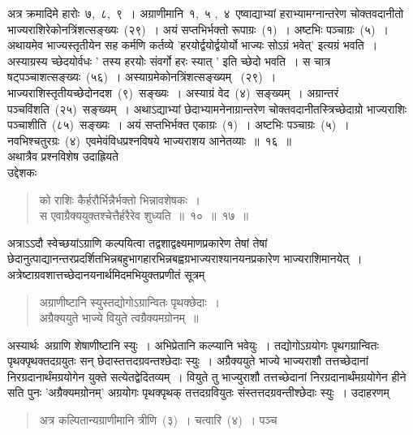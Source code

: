 \documentclass[11pt, openany]{book}
\begin{document}
\indent
अत्र क्रमादिमे हारोः~७,~८,~९~। अग्राणीमानि~१,~५ ,~४~एष्वाद्याभ्यां हराभ्यामग्नान्तरेण चोक्तवदानीतो भाज्यराशिरेकोनत्रिंशत्सङ्ख्यः~(२९)~। अयं सप्तभिर्भक्तो रूपाग्रः~(१)~। अष्टभिः पञ्चाग्रः~(५)~। अथायमेव भाज्यस्तृतीयेन सह कर्मणि कर्तव्ये 'हरयोर्द्वयोर्द्वयोर्यो भाज्यः सोऽग्रं भवेत्' इत्यग्रं भवति~। अस्याग्रस्य च्छेदयोर्वधः ' तस्य हरयोः संवर्गो हरः स्यात् ' इति च्छेदो भवति~। स चात्र षट्पञ्चाशत्सङ्ख्यः~(५६)~। अस्याग्रमेकोनत्रिंशत्सङ्ख्यम् ~(२९)~। भाज्यराशिस्तृतीयच्छेदोनदश~(९)~सङ्ख्यः~। अस्याग्रं वेद~(४)~सङ्ख्यम्~। अग्रान्तरं पञ्चविंशति~(२५)~सङ्ख्यम्~। अथाऽद्याभ्यां छेदाभ्यामनेनाग्रान्तरेण चोक्तवदानीतस्त्रिच्छेदाग्रो भाज्यराशिः पञ्चाशीति~(८५)~सङ्ख्यः~। अयं सप्तभिर्भक्त एकाग्रः~(१)~। अष्टभिः पञ्चाग्रः~(५)~। नवभिश्चतुरग्रः~(४)~एवमेवंविधप्रश्नविषये भाज्यराशय आनेतव्याः~॥~१६~॥\\

अथात्रैव प्रश्नविशेष उदाह्रियते \textendash\\

उद्देशकः\textendash
\begin{quote}
{\ku को राशिः कैर्हरौर्भिन्नैर्भक्तो भिन्नावशेषकः~।\\
स एवाग्रैक्ययुक्तश्चेत्तैर्हरैरेव शुध्यति~॥~१०~॥~१७~॥ }
\end{quote}

\indent
अत्राऽऽदौ स्वेच्छयांऽग्राणि कल्पयित्वा तद्वशाद्वक्ष्यमाणप्रकारेण तेषां तेषां छेदानुत्पाद्यानन्तरप्रदर्शितभिन्नबहुभागहारभिन्नबह्वग्रभाज्यराश्यानयनप्रकारेण भाज्यराशिमानयेत्~। अत्रेष्टाग्रवशात्तच्छेदानयनार्थमिदमभियुक्तप्रणीतं सूत्रम्\textendash
\begin{quote}
{\qt
अग्राणीष्टानि स्युस्तद्योगोऽग्रान्वितः पृथक्छेदाः~।\\
अग्रैक्ययुते भाज्ये वियुते त्वग्रैक्यमग्रोनम्~॥}
\end{quote}

\indent
अस्यार्थः\textendash\ अग्राणि शेषाणीष्टानि स्युः~। अभिप्रेतानि कल्प्यानि भवेयुः~। तद्योगोऽग्रयोगः पृथगग्रान्वितः पृथक्पृथक्तदग्रयुतः सन् छेदास्तत्तदग्रवन्तश्छेदाः स्युः~। अग्रैक्ययुते भाज्ये भाज्यराशौ तत्तच्छेदानां निरग्रदानार्थंमग्रयोगेन युक्ते सत्येतद्वेदितव्यम्~। वियुते तु भाज्युराशौ तत्तच्छेदानां निरग्रदानार्थंमग्रयोगेन हीने सति पुनः 'अग्रैक्यमग्रोनम्' अग्रयोगः पृथक्पृथक् तत्तदग्रवियुतः संस्तत्तदग्रवन्तीश्छेदाः स्युः~। उदाहरणम्\textendash\begin{quote}
{\ku अत्र कल्पितान्यग्राणीमानि त्रीणि~(३)~। चत्वारि~(४)~। पञ्च }
\end{quote}


\newpage
\thispagestyle{fancy}
\fancyhf{}
\end{document}
